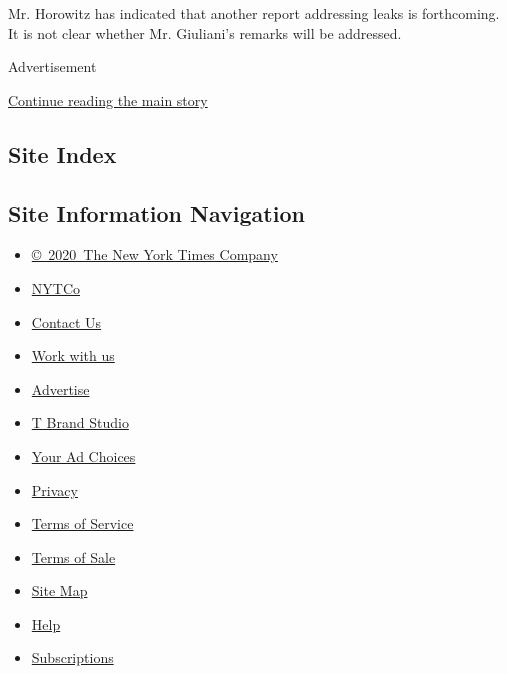 Mr. Horowitz has indicated that another report addressing leaks is
forthcoming. It is not clear whether Mr. Giuliani's remarks will be
addressed.

Advertisement

\protect\hyperlink{after-bottom}{Continue reading the main story}

\hypertarget{site-index}{%
\subsection{Site Index}\label{site-index}}

\hypertarget{site-information-navigation}{%
\subsection{Site Information
Navigation}\label{site-information-navigation}}

\begin{itemize}
\tightlist
\item
  \href{https://help.nytimes.com/hc/en-us/articles/115014792127-Copyright-notice}{©~2020~The
  New York Times Company}
\end{itemize}

\begin{itemize}
\tightlist
\item
  \href{https://www.nytco.com/}{NYTCo}
\item
  \href{https://help.nytimes.com/hc/en-us/articles/115015385887-Contact-Us}{Contact
  Us}
\item
  \href{https://www.nytco.com/careers/}{Work with us}
\item
  \href{https://nytmediakit.com/}{Advertise}
\item
  \href{http://www.tbrandstudio.com/}{T Brand Studio}
\item
  \href{https://www.nytimes.com/privacy/cookie-policy\#how-do-i-manage-trackers}{Your
  Ad Choices}
\item
  \href{https://www.nytimes.com/privacy}{Privacy}
\item
  \href{https://help.nytimes.com/hc/en-us/articles/115014893428-Terms-of-service}{Terms
  of Service}
\item
  \href{https://help.nytimes.com/hc/en-us/articles/115014893968-Terms-of-sale}{Terms
  of Sale}
\item
  \href{https://spiderbites.nytimes.com}{Site Map}
\item
  \href{https://help.nytimes.com/hc/en-us}{Help}
\item
  \href{https://www.nytimes.com/subscription?campaignId=37WXW}{Subscriptions}
\end{itemize}
